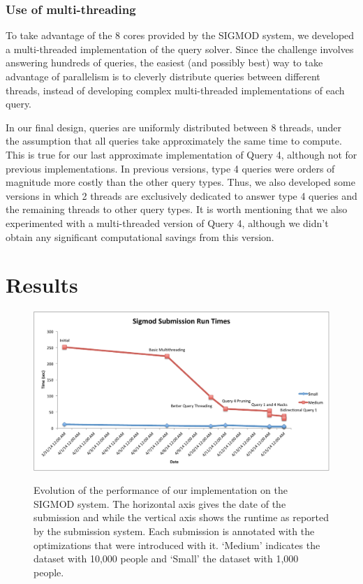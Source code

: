 \documentclass{article}
\begin{document}
\subsubsection{Use of multi-threading}
To take advantage of the 8 cores provided by the SIGMOD system, we developed a 
multi-threaded implementation of the query solver. Since the challenge involves 
answering hundreds of queries, the easiest (and possibly best) way to take 
advantage of parallelism is to cleverly distribute queries between different
threads, instead of developing complex multi-threaded implementations of each 
query. 

In our final design, queries are uniformly distributed between 
8 threads, under the assumption that all queries take approximately the same time
to compute. This is true for our last approximate implementation of Query 4,
although not for previous implementations. In previous versions, type 4 queries were
orders of magnitude more costly than the other query types. Thus, we also 
developed some versions in which 2 threads are exclusively dedicated to answer 
type 4 queries and the remaining threads to other query types. 
It is worth mentioning that we also experimented with a multi-threaded version of Query 4,
 although we didn't obtain any significant computational savings from this version.

\section{Results}

\begin{figure}[t]
  \centering
  \includegraphics[scale=0.5]{img/results.pdf}
  \label{fig:results}
  \caption{Evolution of the performance of our implementation on the
    SIGMOD system.  The horizontal axis gives the date of the
    submission and while the vertical axis shows the runtime as
    reported by the submission system.  Each submission is annotated
    with the optimizations that were introduced with it.  `Medium'
    indicates the dataset with 10,000 people and `Small' the dataset
    with 1,000 people.}
\end{figure}
\end{document}
